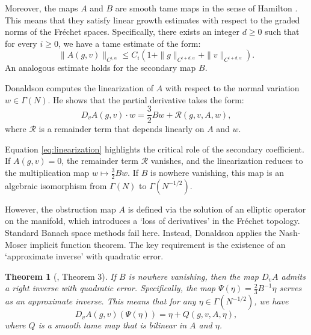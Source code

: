 \documentclass[11pt]{amsart}
\newtheorem{theorem}{Theorem}[section]
\begin{document}
Moreover, the maps $A$ and $B$ are smooth tame maps in the sense of Hamilton \cite{Hamilton1982}. This means that they satisfy linear growth estimates with respect to the graded norms of the Fréchet spaces. Specifically, there exists an integer $d \ge 0$ such that for every $i \ge 0$, we have a tame estimate of the form:
\begin{equation} \label{eq:tame_estimates}
	\| A(g, v) \|_{C^{i,\alpha}} \leq C_i \left( 1 + \| g \|_{C^{i+d,\alpha}} + \| v \|_{C^{i+d,\alpha}} \right).
\end{equation}
An analogous estimate holds for the secondary map $B$.

Donaldson computes the linearization of $A$ with respect to the normal variation $w \in \Gamma(N)$. He shows that the partial derivative takes the form:
\begin{equation} \label{eq:linearization}
	D_v A(g, v) \cdot w = \frac{3}{2} B w + \mathcal{R}(g, v, A, w),
\end{equation}
where $\mathcal{R}$ is a remainder term that depends linearly on $A$ and $w$.

Equation \eqref{eq:linearization} highlights the critical role of the secondary coefficient. If $A(g, v) = 0$, the remainder term $\mathcal{R}$ vanishes, and the linearization reduces to the multiplication map $w \mapsto \frac{3}{2} B w$. If $B$ is nowhere vanishing, this map is an algebraic isomorphism from $\Gamma(N)$ to $\Gamma(N^{-1/2})$.

However, the obstruction map $A$ is defined via the solution of an elliptic operator on the manifold, which introduces a `loss of derivatives' in the Fréchet topology. Standard Banach space methods fail here. Instead, Donaldson applies the Nash-Moser implicit function theorem. The key requirement is the existence of an `approximate inverse' with quadratic error.

\begin{theorem}[\cite{Donaldson2021}, Theorem 3]
	If $B$ is nowhere vanishing, then the map $D_v A$ admits a right inverse with quadratic error. Specifically, the map $\Psi(\eta) = \frac{2}{3} B^{-1} \eta $ serves as an approximate inverse. This means that for any $\eta \in \Gamma(N^{-1/2})$, we have
	\begin{equation} \label{eq:quadratic_error}
		D_v A(g, v) \left( \Psi(\eta) \right) = \eta + Q(g, v, A, \eta),
	\end{equation}
	where $Q$ is a smooth tame map that is bilinear in $A$ and $\eta$.
\end{theorem}
\end{document}

